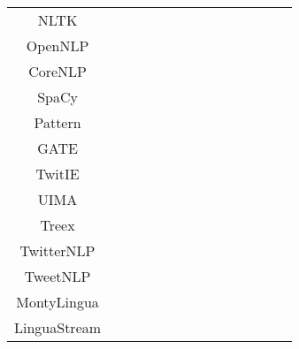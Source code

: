 \begin{landscape}
\begin{table}[H]
{\begin{tabu}{|c|c|c|c|c|c|c|c|c|c|c|c|c|c|}
	& & & & & & & & & & & & & \\
\hline
	NLTK & \ccheck & \ccheck  & \ccheck  & \ccheck  & \ccheck  & \ccheck  & \ccheck  & \xcheck  & \xcheck & \xcheck  & \ccheck & \ccheck & \ccheck  \\
\hline
	OpenNLP & \ccheck & \ccheck  & \ccheck  & \ccheck  & \ccheck  & \ccheck  & \ccheck  & \ccheck  & \xcheck & \xcheck  & \ccheck & \ccheck & \ccheck \\
\hline
	CoreNLP & \ccheck & \ccheck  & \ccheck  & \ccheck  & \ccheck  & \ccheck  & \ccheck  & \ccheck  & \ccheck & \ccheck  & \ccheck & \ccheck & \ccheck \\
\hline
	SpaCy & \ccheck & \xcheck  & \ccheck  & \ccheck  & \ccheck  & \ccheck  & \ccheck  & \xcheck  & \xcheck & \xcheck  & \ccheck & \xcheck & \xcheck \\
\hline
	Pattern& \ccheck & \ccheck  & \ccheck  & \ccheck  & \xcheck  & \ccheck  & \ccheck  & \xcheck  & \ccheck & \xcheck  & \ccheck & \ccheck & \ccheck \\
\hline
	GATE& \ccheck & \ccheck  & \ccheck  & \ccheck  & \ccheck  & \ccheck  & \ccheck  & \ccheck  & \ccheck & \ccheck  & \ccheck & \ccheck & \ccheck \\
\hline
	TwitIE & \ccheck & \xcheck  & \xcheck  & \ccheck  & \ccheck  & \xcheck  & \xcheck  & \xcheck  & \xcheck & \xcheck  & \xcheck & \xcheck & \xcheck \\
\hline
	 UIMA & \ccheck & \ccheck  & \ccheck  & \ccheck  & \ccheck  & \ccheck  & \ccheck  & \ccheck  & \ccheck & \ccheck  & \ccheck & \ccheck & \ccheck \\
\hline
	 Treex & \ccheck & \xcheck  & \ccheck  & \ccheck  & \ccheck  & \xcheck  & \ccheck  & \xcheck  & \xcheck & \xcheck  & \xcheck & \xcheck & \xcheck \\
\hline
	 TwitterNLP & \ccheck & \xcheck  & \xcheck  & \ccheck  & \ccheck  & \ccheck  & \ccheck  & \xcheck  & \xcheck & \xcheck  & \ccheck & \ccheck & \ccheck \\
\hline
	 TweetNLP & \ccheck & \xcheck  & \xcheck  & \ccheck  & \ccheck  & \ccheck  & \ccheck  & \xcheck  & \xcheck & \xcheck  & \xcheck & \xcheck & \xcheck \\
\hline
	 MontyLingua & \ccheck & \xcheck  & \ccheck  & \ccheck  & \ccheck  & \ccheck  & \xcheck  & \xcheck  & \xcheck & \ccheck  & \xcheck & \xcheck & \xcheck \\
\hline
	 LinguaStream & \ccheck & \xcheck  & \ccheck  & \ccheck  & \ccheck  & \ccheck  & \ccheck  & \xcheck  & \xcheck & \xcheck  & \xcheck & \xcheck & \xcheck \\

\end{tabu}}
\end{table}
\end{landscape}
